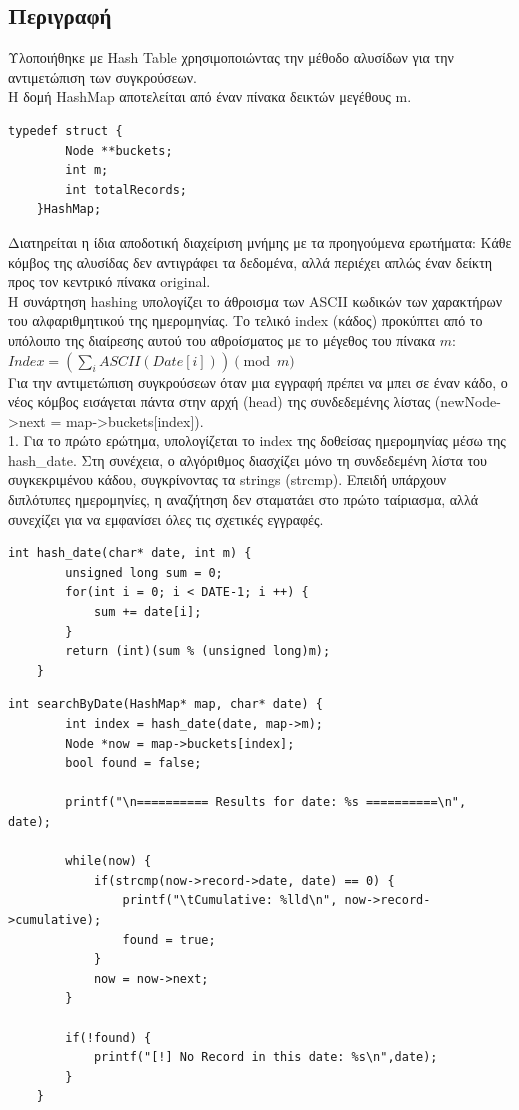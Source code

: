 \documentclass[a4paper,12pt]{article}
\begin{document}
\subsection{Περιγραφή}
Υλοποιήθηκε με Hash Table χρησιμοποιώντας την μέθοδο αλυσίδων για την αντιμετώπιση των συγκρούσεων.\\
Η δομή HashMap αποτελείται από έναν πίνακα δεικτών μεγέθους m.\\
\begin{lstlisting}[caption={Δομή HashMap}]
	typedef struct {
		Node **buckets;
		int m;
		int totalRecords;
	}HashMap;
\end{lstlisting}
Διατηρείται η ίδια αποδοτική διαχείριση μνήμης με τα προηγούμενα ερωτήματα: Κάθε κόμβος της αλυσίδας δεν αντιγράφει τα δεδομένα, αλλά περιέχει απλώς έναν δείκτη προς τον κεντρικό πίνακα original.\\
Η συνάρτηση hashing υπολογίζει το άθροισμα των ASCII κωδικών των χαρακτήρων του αλφαριθμητικού της ημερομηνίας. Το τελικό index (κάδος) προκύπτει από το υπόλοιπο της διαίρεσης αυτού του αθροίσματος με το μέγεθος του πίνακα $m$: $Index = \left( \sum_{i} ASCII(Date[i]) \right) \pmod m$\\
Για την αντιμετώπιση συγκρούσεων όταν μια εγγραφή πρέπει να μπει σε έναν κάδο, ο νέος κόμβος εισάγεται πάντα στην αρχή (head) της συνδεδεμένης λίστας (newNode->next = map->buckets[index]).\\
1. Για το πρώτο ερώτημα, υπολογίζεται το index της δοθείσας ημερομηνίας μέσω της hash\_date. Στη συνέχεια, ο αλγόριθμος διασχίζει μόνο τη συνδεδεμένη λίστα του συγκεκριμένου κάδου, συγκρίνοντας τα strings (strcmp). Επειδή υπάρχουν διπλότυπες ημερομηνίες, η αναζήτηση δεν σταματάει στο πρώτο ταίριασμα, αλλά συνεχίζει για να εμφανίσει όλες τις σχετικές εγγραφές.\\
\begin{lstlisting}[caption={Συνάρτηση hash\_date}]
	int hash_date(char* date, int m) {
		unsigned long sum = 0;
		for(int i = 0; i < DATE-1; i ++) {
			sum += date[i];
		}
		return (int)(sum % (unsigned long)m);
	}
\end{lstlisting}
\begin{lstlisting}[caption={Συνάρτηση searchByDate}]
	int searchByDate(HashMap* map, char* date) {
		int index = hash_date(date, map->m);
		Node *now = map->buckets[index];
		bool found = false;
		
		printf("\n========== Results for date: %s ==========\n", date);
		
		while(now) {
			if(strcmp(now->record->date, date) == 0) {
				printf("\tCumulative: %lld\n", now->record->cumulative);
				found = true;
			}
			now = now->next;
		}
		
		if(!found) {
			printf("[!] No Record in this date: %s\n",date);
		}
	}
\end{lstlisting}
\end{document}
